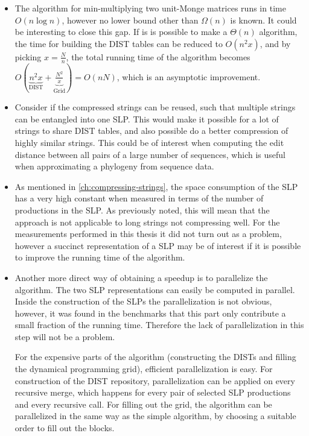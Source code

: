 \documentclass[twoside,11pt,openright]{report}
\newcommand{\DIST}{\operatorname{DIST}}
\begin{document}
\begin{itemize}
  \item The algorithm for min-multiplying two unit-Monge matrices runs in time $O(n \log{n})$, however no lower bound other than $\Omega(n)$ is known. It could be interesting to close this gap. If is is possible to make a $\Theta(n)$ algorithm, the time for building the DIST tables can be reduced to $O(n^2 x)$, and by picking $x = \frac{N}{n}$, the total running time of the algorithm becomes $O(\underbrace{n^2 x}_{\DIST} + \underbrace{\frac{N^2}{x}}_{\text{Grid}}) = O(nN)$, which is an asymptotic improvement.

  \item Consider if the compressed strings can be reused, such that multiple strings can be entangled into one SLP. This would make it possible for a lot of strings to share DIST tables, and also possible do a better compression of highly similar strings. This could be of interest when computing the edit distance between all pairs of a large number of sequences, which is useful when approximating a phylogeny from sequence data.

  \item As mentioned in \cref{ch:compressing-strings}, the space consumption of the SLP has a very high constant when measured in terms of the number of productions in the SLP. As previously noted, this will mean that the approach is not applicable to long strings not compressing well. For the measurements performed in this thesis it did not turn out as a problem, however a succinct representation of a SLP may be of interest if it is possible to improve the running time of the algorithm.

  \item Another more direct way of obtaining a speedup is to parallelize the algorithm. The two SLP representations can easily be computed in parallel. Inside the construction of the SLPs the parallelization is not obvious, however, it was found in the benchmarks that this part only contribute a small fraction of the running time. Therefore the lack of parallelization in this step will not be a problem.

  For the expensive parts of the algorithm (constructing the DISTs and filling the dynamical programming grid), efficient parallelization is easy. For construction of the DIST repository, parallelization can be applied on every recursive merge, which happens for every pair of selected SLP productions and every recursive call.
  For filling out the grid, the algorithm can be parallelized in the same way as the simple algorithm, by choosing a suitable order to fill out the blocks.
\end{itemize}


 

\end{document}
